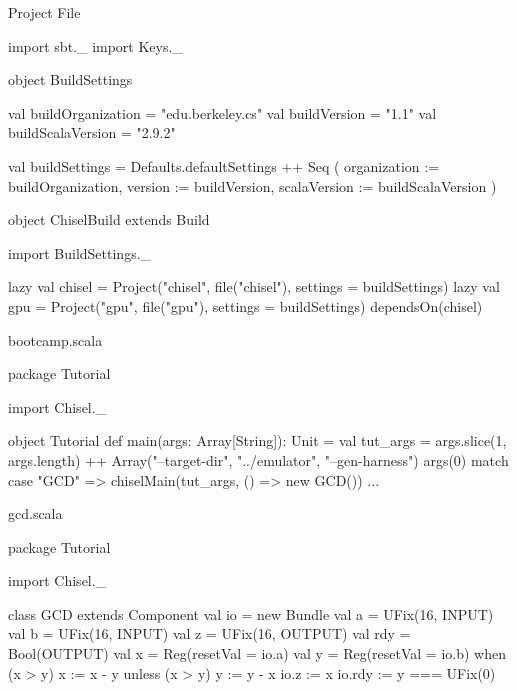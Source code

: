 \documentclass[xcolor=pdflatex,dvipsnames,table]{beamer}
\newenvironment{FramedVerb}%
{\VerbatimEnvironment
\begin{Sbox}\begin{minipage}{.94\textwidth}\begin{Verbatim}}%
{\end{Verbatim}\end{minipage}\end{Sbox}
\setlength{\fboxsep}{8pt}\fbox{\TheSbox}}
\begin{document}
\begin{frame}{Project File}
\begin{scala}
import sbt._
import Keys._

object BuildSettings {
  val buildOrganization = "edu.berkeley.cs"
  val buildVersion = "1.1"
  val buildScalaVersion = "2.9.2"

  val buildSettings = Defaults.defaultSettings ++ Seq (
    organization := buildOrganization,
    version      := buildVersion,
    scalaVersion := buildScalaVersion
  )
}

object ChiselBuild extends Build {
  import BuildSettings._

  lazy val chisel = 
    Project("chisel", file("chisel"), 
      settings = buildSettings)
  lazy val gpu =
    Project("gpu", file("gpu"), settings = buildSettings) 
      dependsOn(chisel)
}
\end{scala}
\end{frame}

\begin{frame}{bootcamp.scala}
\begin{scala}
package Tutorial {

import Chisel._

object Tutorial {
  def main(args: Array[String]): Unit = { 
    val tut_args = args.slice(1, args.length) ++ 
      Array("--target-dir", "../emulator", "--gen-harness")
    args(0) match {
      case "GCD" => 
        chiselMain(tut_args, () => new GCD())
      ...
    }
  }
}

}
\end{scala}
\end{frame}

\begin{frame}{gcd.scala}
\begin{scala}
package Tutorial {

import Chisel._

class GCD extends Component {
  val io = new Bundle {
    val a   = UFix(16, INPUT)
    val b   = UFix(16, INPUT)
    val z   = UFix(16, OUTPUT)
    val rdy = Bool(OUTPUT)
  }
  val x  = Reg(resetVal = io.a)
  val y  = Reg(resetVal = io.b)
  when   (x > y) { x := x - y } 
  unless (x > y) { y := y - x }
  io.z   := x
  io.rdy := y === UFix(0)
}

}
\end{scala}
\end{frame}
\end{document}
